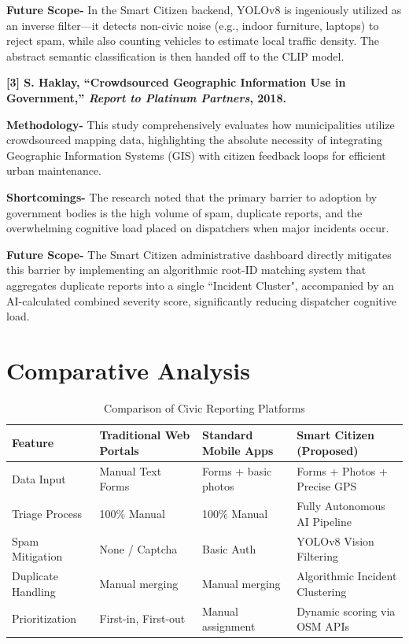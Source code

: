 \documentclass[12pt,a4paper]{report}
\begin{document}
\textbf{Future Scope-} In the Smart Citizen backend, YOLOv8 is ingeniously utilized as an inverse filter—it detects non-civic noise (e.g., indoor furniture, laptops) to reject spam, while also counting vehicles to estimate local traffic density. The abstract semantic classification is then handed off to the CLIP model.

\vspace{0.5cm}
\textbf{[3] S. Haklay, ``Crowdsourced Geographic Information Use in Government,'' \textit{Report to Platinum Partners}, 2018.}

\textbf{Methodology-} This study comprehensively evaluates how municipalities utilize crowdsourced mapping data, highlighting the absolute necessity of integrating Geographic Information Systems (GIS) with citizen feedback loops for efficient urban maintenance.

\textbf{Shortcomings-} The research noted that the primary barrier to adoption by government bodies is the high volume of spam, duplicate reports, and the overwhelming cognitive load placed on dispatchers when major incidents occur.

\textbf{Future Scope-} The Smart Citizen administrative dashboard directly mitigates this barrier by implementing an algorithmic root-ID matching system that aggregates duplicate reports into a single ``Incident Cluster", accompanied by an AI-calculated combined severity score, significantly reducing dispatcher cognitive load.

\section{Comparative Analysis}
\begin{table}[h]
    \centering
    \caption{Comparison of Civic Reporting Platforms}
    \vspace{0.2cm}
    \begin{tabular}{@{}p{} p{} p{} p{}@{}}
        \toprule
        \textbf{Feature} & \textbf{Traditional Web Portals} & \textbf{Standard Mobile Apps} & \textbf{Smart Citizen (Proposed)} \\
        \midrule
        Data Input & Manual Text Forms & Forms + basic photos & Forms + Photos + Precise GPS \\
        Triage Process & 100\% Manual & 100\% Manual & Fully Autonomous AI Pipeline \\
        Spam Mitigation & None / Captcha & Basic Auth & YOLOv8 Vision Filtering \\
        Duplicate Handling & Manual merging & Manual merging & Algorithmic Incident Clustering \\
        Prioritization & First-in, First-out & Manual assignment & Dynamic scoring via OSM APIs \\
        \bottomrule
    \end{tabular}
    \label{tab:comparative_analysis}
\end{table}
\end{document}
